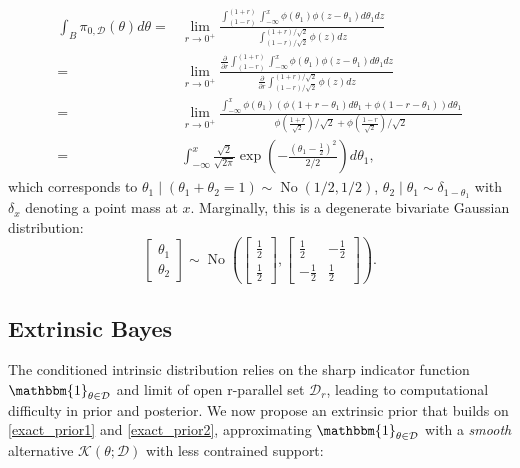\documentclass[10pt]{article}
\newcommand{\mc}[1]{\mathcal{#1}}
\DeclareMathOperator{\No}{No}
\DeclareMathOperator{\1}{\mathbbm{1}}
\begin{document}
\begin{equation*}
	\begin{aligned}
\int_{B} \pi_{0,\mc D}(\theta) d\theta= 
& \lim_{r\rightarrow 0^+}\frac{
	\int_{(1-r)}^{(1+r)} \int_{-\infty}^{x} \phi(\theta_1)\phi(z-\theta_1) d\theta_1 dz  
}{
\int_{(1-r)/\sqrt 2}^{(1+r)/\sqrt 2} \phi(z) dz
} \\ 
= & \lim_{r\rightarrow 0^+}\frac{ \frac{\partial}{\partial r}
	\int_{(1-r)}^{(1+r)} \int_{-\infty}^{x} \phi(\theta_1)\phi(z-\theta_1) d\theta_1 dz  
}{
\frac{\partial}{\partial r}\int_{(1-r)/\sqrt 2}^{(1+r)/\sqrt 2} \phi(z) dz
} \\ 
= &  
\lim_{r\rightarrow 0^+}\frac{
	\int_{-\infty}^{x} \phi(\theta_1)\left( \phi({1+r} -\theta_1) d\theta_1  +  \phi({1-r}-\theta_1)\right) d\theta_1  
}{\phi (\frac{1+r}{\sqrt 2})/\sqrt 2 + \phi (\frac{1-r}{\sqrt 2})/\sqrt 2} \\
= & \int_{-\infty}^{x} \frac{\sqrt{2}}{\sqrt{2\pi}} \exp(-\frac{(\theta_1-\frac{1}{2})^2}{2/2}) d\theta_1,
\end{aligned}
\end{equation*}
which corresponds to $\theta_1\mid (\theta_1+ \theta_2=1) \sim \No(1/2,1/2)$, $\theta_2\mid \theta_1 \sim \delta_{1-\theta_1}$ with $\delta_x$ denoting a point mass at $x$. Marginally, this is a degenerate bivariate Gaussian distribution:
$$\begin{bmatrix} \theta_1 \\ \theta_2 \end{bmatrix} \sim
\No \left(
 \begin{bmatrix} \frac{1}{2} \\ \frac{1}{2} \end{bmatrix},
\begin{bmatrix} \frac{1}{2} & -\frac{1}{2}  \\  -\frac{1}{2}  & \frac{1}{2} \end{bmatrix}
\right).$$



\subsection{Extrinsic Bayes}
The conditioned intrinsic distribution relies on the sharp indicator function $\mathbbm{1}_{\theta\in \mc D}$ and limit of open r-parallel set $\mc D_r$, leading to computational difficulty in prior and posterior. We now propose an extrinsic prior that builds on \eqref{exact_prior1} and \eqref{exact_prior2}, approximating $\mathbbm{1}_{\theta\in \mc D}$ with a {\em smooth} alternative $\mc{K}( \theta; \mc D)$ with less contrained support:
\end{document}
